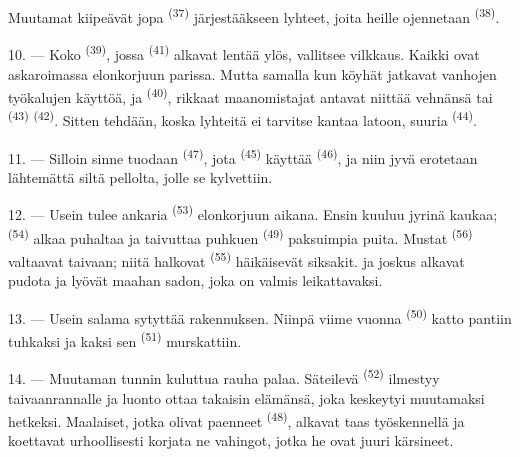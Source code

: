 Muutamat kiipeävät jopa  \textsuperscript{(37)}
järjestääkseen lyhteet, joita heille ojennetaan 
\textsuperscript{(38)}.

10. --- Koko  \textsuperscript{(39)}, jossa 
\textsuperscript{(41)} alkavat lentää ylös, vallitsee vilkkaus. Kaikki ovat
askaroimassa elonkorjuun parissa. Mutta samalla kun köyhät jatkavat vanhojen
työkalujen käyttöä,  ja 
\textsuperscript{(40)}, rikkaat maanomistajat antavat niittää vehnänsä tai
 \textsuperscript{(43)} 
\textsuperscript{(42)}. Sitten tehdään, koska lyhteitä ei tarvitse kantaa
latoon, suuria  \textsuperscript{(44)}.

11. --- Silloin sinne tuodaan  \textsuperscript{(47)}, jota
 \textsuperscript{(45)} käyttää 
\textsuperscript{(46)}, ja niin jyvä erotetaan  lähtemättä siltä
pellolta, jolle se kylvettiin.

\VUsaut{5.0mm}
\VUsaut{3.4mm}

12. --- Usein tulee ankaria  \textsuperscript{(53)}
elonkorjuun aikana. Ensin kuuluu  jyrinä kaukaa;  \textsuperscript{(54)} alkaa puhaltaa ja taivuttaa puhkuen
 \textsuperscript{(49)} paksuimpia puita. Mustat
 \textsuperscript{(56)} valtaavat taivaan; niitä halkovat
 \textsuperscript{(55)} häikäisevät siksakit.  ja
joskus  alkavat pudota ja lyövät maahan sadon, joka on valmis
leikattavaksi.

13. --- Usein salama sytyttää rakennuksen. Niinpä viime vuonna
 \textsuperscript{(50)} katto pantiin tuhkaksi ja kaksi sen
 \textsuperscript{(51)} murskattiin.

14. --- Muutaman tunnin kuluttua rauha palaa. Säteilevä 
\textsuperscript{(52)} ilmestyy taivaanrannalle ja luonto ottaa takaisin
elämänsä, joka keskeytyi muutamaksi hetkeksi. Maalaiset, jotka olivat paenneet
 \textsuperscript{(48)}, alkavat taas työskennellä ja koettavat
urhoollisesti korjata ne vahingot, jotka he ovat juuri kärsineet.

\VUsaut{6.0mm}
\VUsaut{3.6mm}

